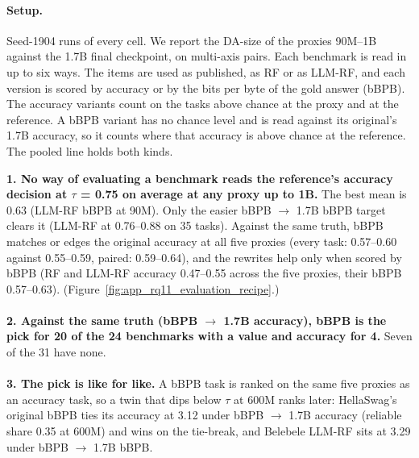 {\begin{minipage}[t]{0.485\textwidth}
\paragraph{Setup.} Seed-1904 runs of every cell. We report the DA-size of the proxies 90M--1B against the 1.7B final checkpoint, on multi-axis pairs. Each benchmark is read in up to six ways. The items are used as published, as RF or as LLM-RF, and each version is scored by accuracy or by the bits per byte of the gold answer (bBPB). The accuracy variants count on the tasks above chance at the proxy and at the reference. A bBPB variant has no chance level and is read against its original's 1.7B accuracy, so it counts where that accuracy is above chance at the reference. The pooled line holds both kinds.
\end{minipage}\hfill
\begin{minipage}[t]{0.485\textwidth}
\vspace{0pt}
\begin{rqfinding}
\textbf{1. No way of evaluating a benchmark reads the reference's accuracy decision at $\tau$ = 0.75 on average at any proxy up to 1B.} The best mean is 0.63 (LLM-RF bBPB at 90M). Only the easier bBPB $\rightarrow$ 1.7B bBPB target clears it (LLM-RF at 0.76--0.88 on 35 tasks). Against the same truth, bBPB matches or edges the original accuracy at all five proxies (every task: 0.57--0.60 against 0.55--0.59, paired: 0.59--0.64), and the rewrites help only when scored by bBPB (RF and LLM-RF accuracy 0.47--0.55 across the five proxies, their bBPB 0.57--0.63). (Figure~\ref{fig:app_rq11_evaluation_recipe}.)
\\
\\
\textbf{2. Against the same truth (bBPB $\rightarrow$ 1.7B accuracy), bBPB is the pick for 20 of the 24 benchmarks with a value and accuracy for 4.} Seven of the 31 have none.
\\
\\
\textbf{3. The pick is like for like.} A bBPB task is ranked on the same five proxies as an accuracy task, so a twin that dips below $\tau$ at 600M ranks later: HellaSwag's original bBPB ties its accuracy at 3.12 under bBPB $\rightarrow$ 1.7B accuracy (reliable share 0.35 at 600M) and wins on the tie-break, and Belebele LLM-RF sits at 3.29 under bBPB $\rightarrow$ 1.7B bBPB.
\end{rqfinding}
\end{minipage}

}
